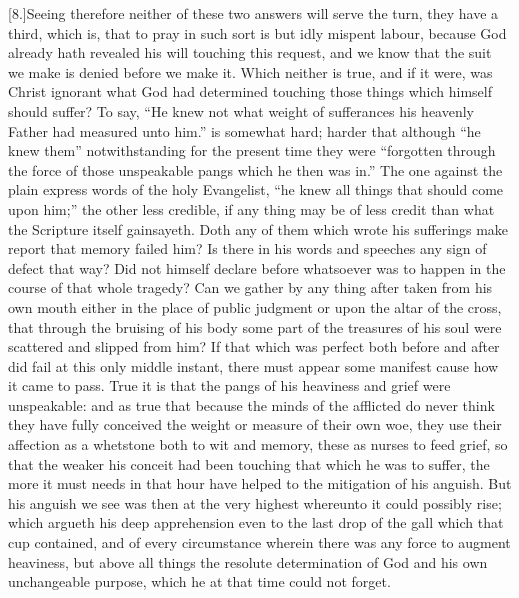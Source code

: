 [8.]Seeing therefore neither of these two answers will serve the turn, they have a third, which is, that to pray in such sort is but idly mispent labour, because God already hath revealed his will touching this request, and we know that the suit we make is denied before we make it. Which neither is true, and if it were, was Christ ignorant what God had determined touching those things which himself should suffer? To say, “He knew not what weight of sufferances his heavenly Father had measured unto him.” is somewhat hard; harder that although “he knew them” notwithstanding for the present time they were “forgotten through the force of those unspeakable pangs which he then was in.” The one against the plain express words of the holy Evangelist, “he knew all things that should come upon him;” the other less credible, if any thing may be of less credit than what the Scripture itself gainsayeth. Doth any of them which wrote his sufferings make report that memory failed him? Is there in his words and speeches any sign of defect that way? Did not himself declare before whatsoever was to happen in the  course of that whole tragedy?
 Can we gather by any thing after taken from his own mouth either in the place of public judgment or upon the altar of the cross, that through the bruising of his body some part of the treasures of his soul were scattered and slipped from him? If that which was perfect both before and after did fail at this only middle instant, there must appear some manifest cause how it came to pass. True it is that the pangs of his heaviness and grief were unspeakable: and as true that because the minds of the afflicted do never think they have fully conceived the weight or measure of their own woe, they use their affection as a whetstone both to wit and memory, these as nurses to feed grief, so that the weaker his conceit had been touching that which he was to suffer, the more it must needs in that hour have helped to the mitigation of his anguish. But his anguish we see was then at the very highest whereunto it could possibly rise; which argueth his deep apprehension even to the last drop of the gall which that cup contained, and of every circumstance wherein there was any force to augment heaviness, but above all things the resolute determination of God and his own unchangeable purpose, which he at that time could not forget.

